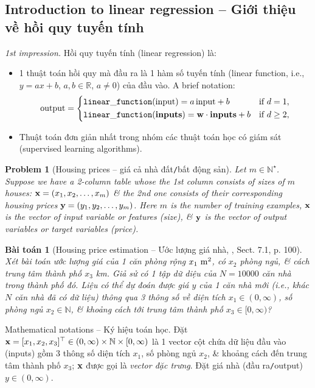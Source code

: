 \documentclass{article}
\newtheorem{baitoan}{Bài toán}
\newtheorem{problem}{Problem}
\begin{document}
\subsection{Introduction to linear regression -- Giới thiệu về hồi quy tuyến tính}
{\it1st impression.} Hồi quy tuyến tính (linear regression) là:
\begin{itemize}
	\item 1 thuật toán hồi quy mà đầu ra là 1 hàm số tuyến tính (linear function, i.e., $y = ax + b$, $a,b\in\mathbb{R}$, $a\ne0$) của đầu vào. A brief notation:
	\begin{equation*}
		{\rm output} = \left\{\begin{split}
			&{\tt linear\_function}({\rm input}) = a\,{\rm input} + b&&\mbox{if } d = 1,\\
			&{\tt linear\_function}({\bf inputs}) = {\bf w}\cdot{\bf inputs} + b&&\mbox{if } d\ge2,\\
		\end{split}\right.
	\end{equation*}
	\item Thuật toán đơn giản nhất trong nhóm các thuật toán học có giám sát (supervised learning algorithms).
\end{itemize}

\begin{problem}[Housing prices -- giá cả nhà đất{\tt/}bất động sản]
	Let $m\in\mathbb{N}^\star$. Suppose we have a 2-column table whose the 1st column consists of sizes of $m$ houses: ${\bf x} = (x_1,x_2,\ldots,x_m)$ \& the 2nd one consists of their corresponding housing prices ${\bf y} = (y_1,y_2,\ldots,y_m)$. Here $m$ is the number of training examples, ${\bf x}$ is the vector of input variable or features (size), \& ${\bf y}$ is the vector of output variables or target variables (price).
\end{problem}

\begin{baitoan}[Housing price estimation -- Ước lượng giá nhà, \cite{Tiep_ML_co_ban}, Sect. 7.1, p. 100]
	Xét bài toán ước lượng giá của 1 căn phòng rộng $x_1\ {\rm m}^2$, có $x_2$ phòng ngủ, \& cách trung tâm thành phố $x_3$ km. Giả sử có 1 tập dữ diệu của $N = 10000$ căn nhà trong thành phố đó. Liệu có thể dự đoán được giá $y$ của 1 căn nhà mới (i.e., khác $N$ căn nhà đã có dữ liệu) thông qua 3 thông số về diện tích $x_1\in(0,\infty)$, số phòng ngủ $x_2\in\mathbb{N}$, \& khoảng cách tới trung tâm thành phố $x_3\in[0,\infty)$?
\end{baitoan}
{\sf Mathematical notations -- Ký hiệu toán học.} Đặt ${\bf x} = [x_1,x_2,x_3]^\top\in(0,\infty)\times\mathbb{N}\times[0,\infty)$ là 1 vector cột chứa dữ liệu đầu vào (inputs) gồm 3 thông số diện tích $x_1$, số phòng ngủ $x_2$, \& khoảng cách đến trung tâm thành phố $x_3$; ${\bf x}$ được gọi là {\it vector đặc trưng}. Đặt giá nhà (đầu ra{\tt/}output) $y\in(0,\infty)$.
\end{document}
